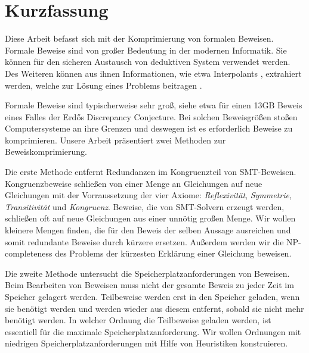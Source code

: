 \chapter*{Kurzfassung}

Diese Arbeit befasst sich mit der Komprimierung von formalen Beweisen.
Formale Beweise sind von gro{\ss}er Bedeutung in der modernen Informatik.
Sie k\"onnen f\"ur den sicheren Austausch von deduktiven System verwendet werden.
Des Weiteren k\"onnen aus ihnen Informationen, wie etwa Interpolants \cite{McMill2005}, extrahiert werden, welche zur L\"osung eines Problems beitragen \cite{Hofferek2013}.

Formale Beweise sind typischerweise sehr gro{\ss}, siehe etwa \cite{Konev2014} f\"ur einen 13GB Beweis eines Falles der Erd\H{o}s Discrepancy Conjecture.
Bei solchen Beweisgr\"o{\ss}en sto{\ss}en Computersysteme an ihre Grenzen und deswegen ist es erforderlich Beweise zu komprimieren.
Unsere Arbeit pr\"asentiert zwei Methoden zur Beweiskomprimierung.

Die erste Methode entfernt Redundanzen im Kongruenzteil von SMT-Beweisen.
Kongruenzbeweise schlie{\ss}en von einer Menge an Gleichungen auf neue Gleichungen mit der Vorraussetzung der vier Axiome: \emph{Reflexivit\"at}, \emph{Symmetrie}, \emph{Transitivit\"at} und \emph{Kongruenz}.
Beweise, die von SMT-Solvern erzeugt werden, schlie{\ss}en oft auf neue Gleichungen aus einer unn\"otig gro{\ss}en Menge.
Wir wollen kleinere Mengen finden, die f\"ur den Beweis der selben Aussage ausreichen und somit redundante Beweise durch k\"urzere ersetzen.
Au{\ss}erdem werden wir die NP-completeness des Problems der k\"urzesten Erkl\"arung einer Gleichung beweisen.

Die zweite Methode untersucht die Speicherplatzanforderungen von Beweisen.
Beim Bearbeiten von Beweisen muss nicht der gesamte Beweis zu jeder Zeit im Speicher gelagert werden.
Teilbeweise werden erst in den Speicher geladen, wenn sie ben\"otigt werden und werden wieder aus diesem entfernt, sobald sie nicht mehr ben\"otigt werden.
In welcher Ordnung die Teilbeweise geladen werden, ist essentiell f\"ur die maximale Speicherplatzanforderung.
Wir wollen Ordnungen mit niedrigen Speicherplatzanforderungen mit Hilfe von Heuristiken konstruieren.